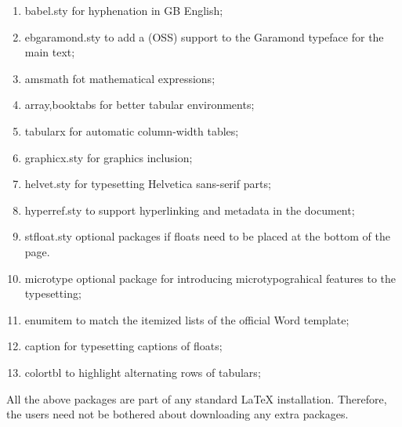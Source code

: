 \documentclass[11pt,onecolumn,notitlepage]{article}
\def\file#1{\textsf{\fontsize{9.2}{9.5}\selectfont\color{MidnightBlue}#1}\xspace}
\begin{document}
\begin{enumerate}
	\item \file{babel.sty} for hyphenation in GB English;
	\item \file{ebgaramond.sty} to add a (OSS) support to the Garamond typeface for the main text;
	\item \file{amsmath} fot mathematical expressions;
	\item \file{array,booktabs} for better tabular environments;
	\item \file{tabularx} for automatic column-width tables;
	\item \file{graphicx.sty} for graphics inclusion;
	\item \file{helvet.sty} for typesetting Helvetica sans-serif parts;
	\item \file{hyperref.sty} to support hyperlinking and metadata in the document;
	\item \file{stfloat.sty} optional packages if floats need to be placed at
	the bottom of the page.
	\item \file{microtype} optional package for introducing microtypograhical features to the typesetting;
	\item \file{enumitem} to match the itemized lists of the official Word template;
	\item \file{caption} for typesetting captions of floats;
	\item \file{colortbl} to highlight alternating rows of tabulars;
\end{enumerate}

All the above packages are part of any
standard \LaTeX{} installation. Therefore, the users need not be
bothered about downloading any extra packages.




\end{document}
